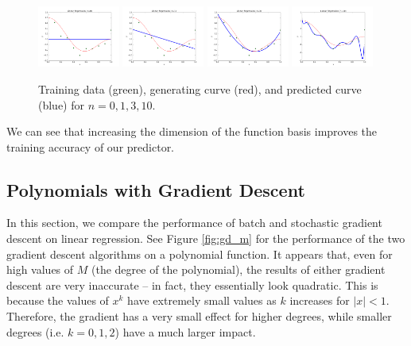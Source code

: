 \documentclass[10pt]{paper}
\begin{document}
\begin{figure}[ht!]
  \centering
  \label{fig:poly}
  \includegraphics[width=0.24\textwidth]{../images/poly0.png}
  \includegraphics[width=0.24\textwidth]{../images/poly1.png}
  \includegraphics[width=0.24\textwidth]{../images/poly3.png}
  \includegraphics[width=0.24\textwidth]{../images/poly10.png}
  \caption{Training data (green), generating curve (red), and predicted curve (blue) for $n = 0, 1, 3, 10$.}
\end{figure}

We can see that increasing the dimension of the function basis improves the training accuracy of our predictor.

\subsection{Polynomials with Gradient Descent}

In this section, we compare the performance of batch and stochastic gradient descent on linear regression. See Figure \ref{fig:gd_m} for the performance of the two gradient descent algorithms on a polynomial function. It appears that, even for high values of $M$ (the degree of the polynomial), the results of either gradient descent are very inaccurate -- in fact, they essentially look quadratic. This is because the values of $x^k$ have extremely small values as $k$ increases for $|x| < 1$. Therefore, the gradient has a very small effect for higher degrees, while smaller degrees (i.e. $k = 0, 1, 2$) have a much larger impact. 
\end{document}
